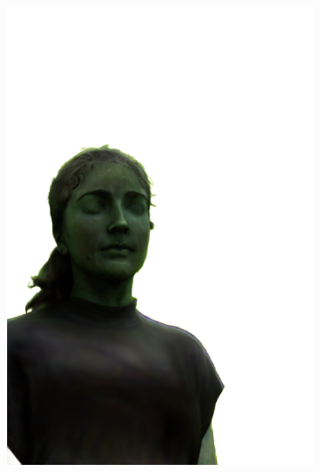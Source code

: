 \begin{figure}[ht]
\begin{subfigure}{0.08\linewidth}
        \includegraphics[width=\textwidth]{Figures/results/low/irene_stone/11_render.png}

\end{subfigure}
\end{figure}
